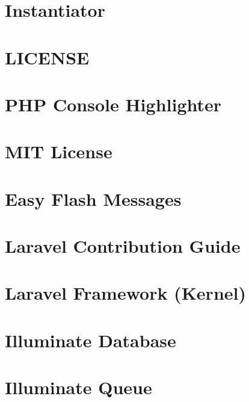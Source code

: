\documentclass[twoside]{book}
\newcommand{\+}{\discretionary{\mbox{\scriptsize$\hookleftarrow$}}{}{}}
\begin{document}
\chapter{Instantiator}
\label{md_vendor_doctrine_instantiator__r_e_a_d_m_e}

\chapter{L\+I\+C\+E\+N\+S\+E}
\label{md_vendor_ircmaxell_password-compat__l_i_c_e_n_s_e}

\chapter{P\+H\+P Console Highlighter}
\label{md_vendor_jakub-onderka_php-console-highlighter__r_e_a_d_m_e}

\chapter{M\+I\+T License}
\label{md_vendor_jeremeamia__super_closure__l_i_c_e_n_s_e}

\chapter{Easy Flash Messages}
\label{md_vendor_laracasts_flash_readme}

\chapter{Laravel Contribution Guide}
\label{md_vendor_laravel_framework__c_o_n_t_r_i_b_u_t_i_n_g}

\chapter{Laravel Framework (Kernel)}
\label{md_vendor_laravel_framework_readme}

\chapter{Illuminate Database}
\label{md_vendor_laravel_framework_src__illuminate__database__r_e_a_d_m_e}

\chapter{Illuminate Queue}
\label{md_vendor_laravel_framework_src__illuminate__queue__r_e_a_d_m_e}

\end{document}
